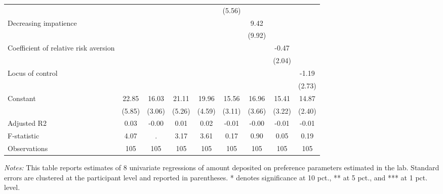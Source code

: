 \begin{table}[h]
{\begin{threeparttable}
\begin{tabular}{l*{8}{c}}
                &                  &                  &                  &                  &   (5.56)         &                  &                  &                  \\
Decreasing impatience&                  &                  &                  &                  &                  &     9.42         &                  &                  \\
                &                  &                  &                  &                  &                  &   (9.92)         &                  &                  \\
Coefficient of relative risk aversion&                  &                  &                  &                  &                  &                  &    -0.47         &                  \\
                &                  &                  &                  &                  &                  &                  &   (2.04)         &                  \\
Locus of control&                  &                  &                  &                  &                  &                  &                  &    -1.19         \\
                &                  &                  &                  &                  &                  &                  &                  &   (2.73)         \\
Constant        &    22.85\sym{***}&    16.03\sym{***}&    21.11\sym{***}&    19.96\sym{***}&    15.56\sym{***}&    16.96\sym{***}&    15.41\sym{***}&    14.87\sym{***}\\
                &   (5.85)         &   (3.06)         &   (5.26)         &   (4.59)         &   (3.11)         &   (3.66)         &   (3.22)         &   (2.40)         \\
\midrule
Adjusted R2     &     0.03         &    -0.00         &     0.01         &     0.02         &    -0.01         &    -0.00         &    -0.01         &    -0.01         \\
F-statistic     &     4.07         &        .         &     3.17         &     3.61         &     0.17         &     0.90         &     0.05         &     0.19         \\
Observations    &      105         &      105         &      105         &      105         &      105         &      105         &      105         &      105         \\
\bottomrule \end{tabular} \begin{tablenotes}[flushleft] \footnotesize \item \emph{Notes:} This table reports estimates of 8 univariate regressions of amount deposited on preference parameters estimated in the lab. Standard errors are clustered at the participant level and reported in parentheses. * denotes significance at 10 pct., ** at 5 pct., and *** at 1 pct. level. \end{tablenotes} \end{threeparttable} } \end{table}
